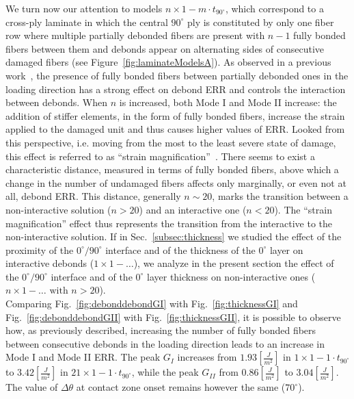 \documentclass[review]{elsarticle}
\begin{document}
We turn now our attention to models $n\times 1-m\cdot t_{90^{\circ}}$, which correspond to a cross-ply laminate in which the central $90^{\circ}$ ply is constituted by only one fiber row where multiple partially debonded fibers are present with $n-1$ fully bonded fibers between them and debonds appear on alternating sides of consecutive damaged fibers (see Figure~\ref{fig:laminateModelsA}). %
As observed in a previous work~\cite{DiStasio2019}, the presence of fully bonded fibers between partially debonded ones in the loading direction has a strong effect on debond ERR and controls the interaction between debonds. When $n$ is increased, both Mode I and Mode II increase: the addition of stiffer elements, in the form of fully bonded fibers, increase the strain applied to the damaged unit and thus causes higher values of ERR. Looked from this perspective, i.e. moving from the most to the least severe state of damage, this effect is referred to as ``strain magnification''~\cite{DiStasio2019}. There seems to exist a characteristic distance, measured in terms of fully bonded fibers, above which a change in the number of undamaged fibers affects only marginally, or even not at all, debond ERR. This distance, generally $n\sim20$, marks the transition between a non-interactive solution ($n>20$) and an interactive one ($n<20$). The ``strain magnification'' effect thus represents the transition from the interactive to the non-interactive solution. If in Sec.~\ref{subsec:thickness} we studied the effect of the proximity of the $0^{\circ}/90^{\circ}$ interface and of the thickness of the $0^{\circ}$ layer on interactive debonds ($1\times 1-\dots$), we analyze in the present section the effect of the $0^{\circ}/90^{\circ}$ interface and of the $0^{\circ}$ layer thickness on non-interactive ones ($n\times 1-\dots\text{ with }n>20$).\\
Comparing Fig.~\ref{fig:debonddebondGI} with Fig.~\ref{fig:thicknessGI} and Fig.~\ref{fig:debonddebondGII} with Fig.~\ref{fig:thicknessGII}, it is possible to observe how, as previously described, increasing the number of fully bonded fibers between consecutive debonds in the loading direction leads to an increase in Mode I and Mode II ERR. The peak $G_{I}$ increases from $1.93 \left[\frac{J}{m^{2}}\right]$ in $1\times 1-1\cdot t_{90^{\circ}}$ to $3.42 \left[\frac{J}{m^{2}}\right]$ in $21\times 1-1\cdot t_{90^{\circ}}$, while the peak $G_{II}$ from $0.86 \left[\frac{J}{m^{2}}\right]$ to $3.04 \left[\frac{J}{m^{2}}\right]$. The value of $\Delta\theta$ at contact zone onset remains however the same ($70^{\circ}$).\\
\end{document}
